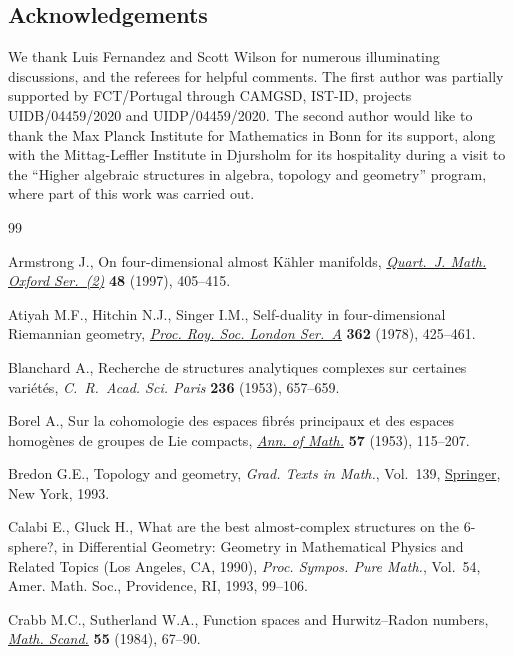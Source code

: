 \documentclass[pdftex]{sigma}%
\numberwithin{equation}{section}
\begin{document}
\subsection*{Acknowledgements}
We thank Luis Fernandez and Scott Wilson for numerous illuminating discussions, and the referees for helpful comments. The first author was partially supported by FCT/Portugal through CAMGSD, IST-ID, projects UIDB/04459/2020 and UIDP/04459/2020. The second author would like to thank the Max Planck Institute for Mathematics in Bonn for its support, along with the Mittag-Leffler Institute in Djursholm for its hospitality during a visit to the ``Higher algebraic structures in algebra, topology and geometry'' program, where part of this work was carried out.

\begin{thebibliography}{99}
\footnotesize\itemsep=0pt

Armstrong J., On four-dimensional almost {K}\"ahler manifolds,
 \href{https://doi.org/10.1093/qmath/48.4.405}{\textit{Quart.~J. Math. Oxford Ser.~(2)}} \textbf{48} (1997), 405--415.

Atiyah M.F., Hitchin N.J., Singer I.M., Self-duality in four-dimensional
 {R}iemannian geometry, \href{https://doi.org/10.1098/rspa.1978.0143}{\textit{Proc. Roy. Soc. London Ser.~A}} \textbf{362}
 (1978), 425--461.

Blanchard A., Recherche de structures analytiques complexes sur certaines
 vari\'et\'es, \textit{C.~R.~Acad. Sci. Paris} \textbf{236} (1953), 657--659.

Borel A., Sur la cohomologie des espaces fibr\'es principaux et des espaces
 homog\`enes de groupes de {L}ie compacts, \href{https://doi.org/10.2307/1969728}{\textit{Ann. of Math.}} \textbf{57}
 (1953), 115--207.

Bredon G.E., Topology and geometry, \textit{Grad. Texts in Math.}, Vol.~139,
 \href{https://doi.org/10.1007/978-1-4757-6848-0}{Springer}, New York, 1993.

Calabi E., Gluck H., What are the best almost-complex structures on the
 {$6$}-sphere?, in Differential Geometry: Geometry in Mathematical Physics and
 Related Topics ({L}os {A}ngeles, {CA}, 1990), \textit{Proc. Sympos. Pure
 Math.}, Vol.~54, Amer. Math. Soc., Providence, RI, 1993, 99--106.

Crabb M.C., Sutherland W.A., Function spaces and {H}urwitz--{R}adon numbers,
 \href{https://doi.org/10.7146/math.scand.a-12068}{\textit{Math. Scand.}} \textbf{55} (1984), 67--90.


\end{thebibliography}
\end{document}
